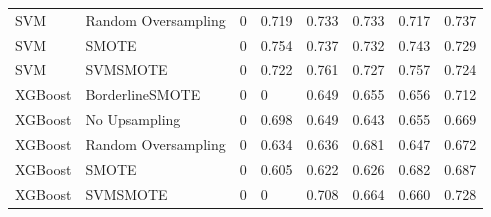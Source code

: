 \begin{tabular}{llllllll}
                         SVM & Random Oversampling &     0 &                     0.719 &                 0.733 &                  0.733 &                                   0.717 &    0.737 \\
                         SVM &               SMOTE &     0 &                     0.754 &                 0.737 &                  0.732 &                                   0.743 &    0.729 \\
                         SVM &            SVMSMOTE &     0 &                     0.722 &                 0.761 &                  0.727 &                                   0.757 &    0.724 \\
                     XGBoost &     BorderlineSMOTE &     0 &                         0 &                 0.649 &                  0.655 &                                   0.656 &    0.712 \\
                     XGBoost &       No Upsampling &     0 &                     0.698 &                 0.649 &                  0.643 &                                   0.655 &    0.669 \\
                     XGBoost & Random Oversampling &     0 &                     0.634 &                 0.636 &                  0.681 &                                   0.647 &    0.672 \\
                     XGBoost &               SMOTE &     0 &                     0.605 &                 0.622 &                  0.626 &                                   0.682 &    0.687 \\
                     XGBoost &            SVMSMOTE &     0 &                         0 &                 0.708 &                  0.664 &                                   0.660 &    0.728 \\
\bottomrule
\end{tabular}
